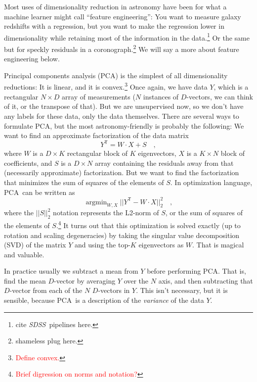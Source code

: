 \documentclass[12pt, letterpaper]{article}
\newcommand{\acronym}[1]{{\small{#1}}}
\newcommand{\PCA}{\acronym{PCA}}
\newcommand{\SVD}{\acronym{SVD}}
\newcommand{\project}[1]{\textsl{#1}}
\newcommand{\SDSS}{\project{\acronym{SDSS}}}
\newcommand{\todo}[1]{\textcolor{red}{#1}}  %
\newcommand{\T}{^{\mathsf{T}}}
\DeclareMathOperator*{\argmin}{argmin}
\begin{document}
Most uses of dimensionality reduction in astronomy have been for 
what a machine learner might call ``feature engineering'': You want
to measure galaxy redshifts with a regression, but you want to make the regression
lower in dimensionality while retaining most of the information
in the data.\footnote{cite \SDSS\ pipelines here.}
Or the same but for speckly residuals in a coronograph.\footnote{shameless plug here.}
We will say a more about feature engineering below.

Principal components analysis (\PCA) is the simplest of all dimensionality
reductions: It is linear, and it is convex.\footnote{\todo{Define convex.}}
Once again, we have data $Y$, which is a rectangular $N\times D$ array of
measurements ($N$ instances of $D$-vectors, we can think of it, or the transpose
of that).
But we are unsupervised now, so we don't have any labels for these data, only
the data themselves.
There are several ways to formulate \PCA, but the most astronomy-friendly
is probably the following:
We want to find an approximate factorization of the data matrix
\begin{equation}
Y\T = W \cdot X + S
\quad ,
\end{equation}
where $W$ is a $D\times K$ rectangular block of $K$ eigenvectors,
$X$ is a $K\times N$ block of coefficients,
and $S$ is a $D\times N$ array containing the residuals away from that
(necessarily approximate) factorization.
But we want to find the factorization that minimizes 
the sum of squares of the elements of $S$.
In optimization language, \PCA\ can be written as
\begin{equation}\label{eq:pcaopt}
\argmin_{W, X} ||Y\T - W \cdot X||_2^2
\quad ,
\end{equation}
where the $||S||_2^2$ notation represents the L2-norm of $S$, or the sum of squares
of the elements of $S$.\footnote{\todo{Brief digression on norms and notation?}}
It turns out that this optimization is solved exactly (up to rotation and scaling
degeneracies) by taking the singular value decomposition (\SVD) of the matrix $Y$
and using the top-$K$ eigenvectors as $W$.
That is magical and valuable.

In practice usually we subtract a mean from $Y$ before performing \PCA.
That is, find the mean $D$-vector by averaging $Y$ over the $N$ axis,
and then subtracting that $D$-vector from each of the $N$ $D$-vectors
in $Y$.
This isn't necessary, but it is sensible, because \PCA\ is a description
of the \emph{variance} of the data $Y$.
\end{document}
